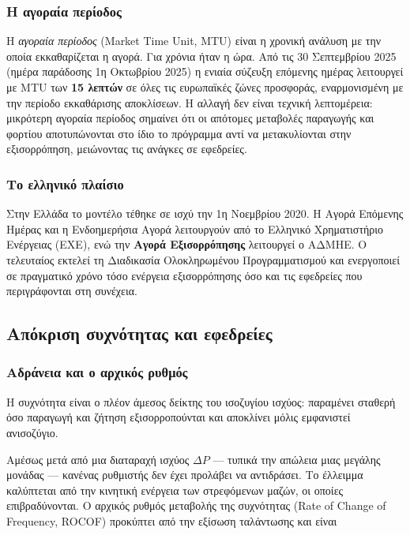 \subsubsection*{Η αγοραία περίοδος}

Η \emph{αγοραία περίοδος} (Market Time Unit, MTU) είναι η χρονική ανάλυση με την οποία
εκκαθαρίζεται η αγορά. Για χρόνια ήταν η ώρα. Από τις 30 Σεπτεμβρίου 2025 (ημέρα παράδοσης
1η Οκτωβρίου 2025) η ενιαία σύζευξη επόμενης ημέρας λειτουργεί με MTU των \textbf{15 λεπτών}
σε όλες τις ευρωπαϊκές ζώνες προσφοράς, εναρμονισμένη με την περίοδο εκκαθάρισης
αποκλίσεων. Η αλλαγή δεν είναι τεχνική λεπτομέρεια: μικρότερη αγοραία περίοδος σημαίνει ότι
οι απότομες μεταβολές παραγωγής και φορτίου αποτυπώνονται στο ίδιο το πρόγραμμα αντί να
μετακυλίονται στην εξισορρόπηση, μειώνοντας τις ανάγκες σε εφεδρείες.

\subsubsection*{Το ελληνικό πλαίσιο}

Στην Ελλάδα το μοντέλο τέθηκε σε ισχύ την 1η Νοεμβρίου 2020. Η Αγορά Επόμενης Ημέρας και η
Ενδοημερήσια Αγορά λειτουργούν από το Ελληνικό Χρηματιστήριο Ενέργειας (ΕΧΕ), ενώ την
\textbf{Αγορά Εξισορρόπησης} λειτουργεί ο ΑΔΜΗΕ. Ο τελευταίος εκτελεί τη Διαδικασία
Ολοκληρωμένου Προγραμματισμού και ενεργοποιεί σε πραγματικό χρόνο τόσο ενέργεια
εξισορρόπησης όσο και τις εφεδρείες που περιγράφονται στη συνέχεια.

\subsection{Απόκριση συχνότητας και εφεδρείες}

\subsubsection*{Αδράνεια και ο αρχικός ρυθμός}

Η συχνότητα είναι ο πλέον άμεσος δείκτης του ισοζυγίου ισχύος: παραμένει σταθερή όσο
παραγωγή και ζήτηση εξισορροπούνται και αποκλίνει μόλις εμφανιστεί ανισοζύγιο.

Αμέσως μετά από μια διαταραχή ισχύος $\Delta P$ — τυπικά την απώλεια μιας μεγάλης μονάδας —
κανένας ρυθμιστής δεν έχει προλάβει να αντιδράσει. Το έλλειμμα καλύπτεται από την κινητική
ενέργεια των στρεφόμενων μαζών, οι οποίες επιβραδύνονται. Ο αρχικός ρυθμός μεταβολής της
συχνότητας (Rate of Change of Frequency, ROCOF) προκύπτει από την εξίσωση ταλάντωσης και
είναι

